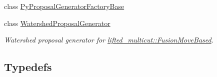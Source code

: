 \begin{DoxyCompactItemize}
\item 
class \hyperlink{classnifty_1_1graph_1_1lifted__multicut_1_1PyProposalGeneratorFactoryBase}{Py\+Proposal\+Generator\+Factory\+Base}
\item 
class \hyperlink{classnifty_1_1graph_1_1lifted__multicut_1_1WatershedProposalGenerator}{Watershed\+Proposal\+Generator}
\begin{DoxyCompactList}\small\item\em Watershed proposal generator for \hyperlink{classnifty_1_1graph_1_1lifted__multicut_1_1FusionMoveBased}{lifted\+\_\+multicut\+::\+Fusion\+Move\+Based}. \end{DoxyCompactList}\end{DoxyCompactItemize}
\subsection*{Typedefs}
